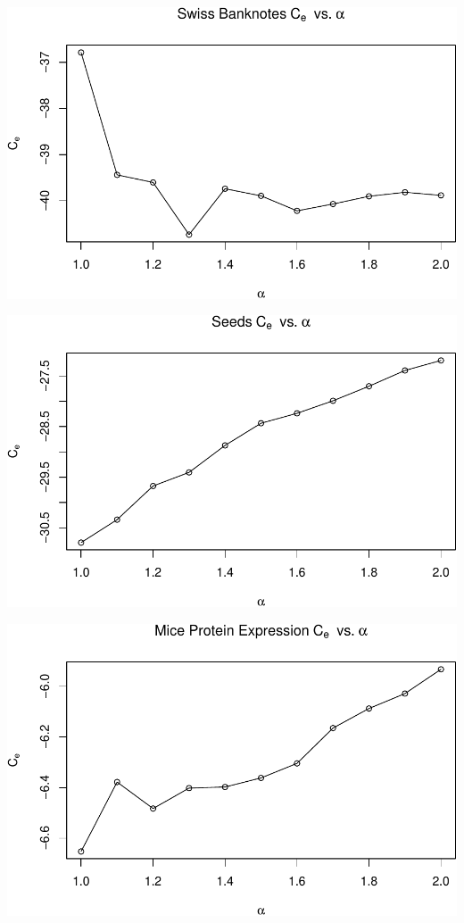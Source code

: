 \documentclass[]{article}
\begin{document}
\begin{center}\includegraphics[width=1\linewidth]{Report_files/figure-latex/unnamed-chunk-22-4} \end{center}

\begin{center}\includegraphics[width=1\linewidth]{Report_files/figure-latex/unnamed-chunk-22-5} \end{center}

\begin{center}\includegraphics[width=1\linewidth]{Report_files/figure-latex/unnamed-chunk-22-6} \end{center}
\end{document}
